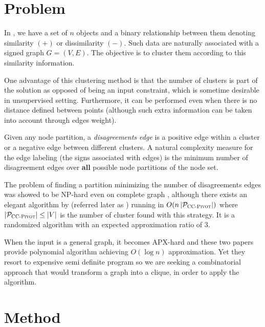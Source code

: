 \section{Problem}

In \pcc{}, we have a set of $n$ objects and a binary relationship between them
denoting similarity $(+)$  or dissimilarity $(-)$. Such data are naturally
associated with a signed graph $G=(V,E)$. The objective is to cluster them
according to this similarity information.

One advantage of this clustering method is that the number of clusters is part
of the solution as opposed of being an input constraint, which is sometime
desirable in unsupervised setting. Furthermore, it can be performed even when
there is no distance defined between points (although such extra information
can be taken into account through edges weight).

Given any node partition, a \emph{disagreements edge} is a positive edge within a
cluster or a negative edge between different clusters. A natural complexity
measure for the edge labeling (the signs associated with edges) is the minimum
number of disagreement edges over \textbf{all} possible node partitions of the node
set.

The problem of finding a partition minimizing the number of disagreements
edges was showed to be NP-hard even on complete graph \autocite{Bansal2002},
although there exists an elegant algorithm by \textcite{Ailon2008} (referred
later as \ccp{}) running in $O(n\left|\mathcal{P}_{\text{\textsc{CC-Pivot}{}}}\right|)$
where $\left|\mathcal{P}_{\text{\textsc{CC-Pivot}{}}}\right| \le |V|$ is the number of
cluster found with this strategy. It is a randomized algorithm with an
expected approximation ratio of $3$.

When the input is a general graph, it becomes APX-hard
\autocites{Charikar2003}{Demaine2006} and these two papers provide polynomial
algorithm achieving $O(\log n)$ approximation. Yet they resort to expensive
semi definite program so we are seeking a combinatorial approach that would
transform a graph into a clique, in order to apply the \ccp{} algorithm.

\section{Method}

